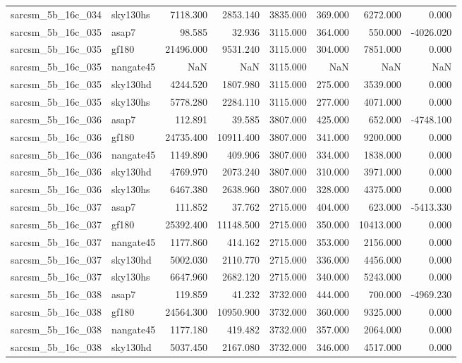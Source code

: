 \begin{tabular}{llrrrrrr}
sarcsm\_5b\_16c\_034 & sky130hs & 7118.300 & 2853.140 & 3835.000 & 369.000 & 6272.000 & 0.000 \\
sarcsm\_5b\_16c\_035 & asap7 & 98.585 & 32.936 & 3115.000 & 364.000 & 550.000 & -4026.020 \\
sarcsm\_5b\_16c\_035 & gf180 & 21496.000 & 9531.240 & 3115.000 & 304.000 & 7851.000 & 0.000 \\
sarcsm\_5b\_16c\_035 & nangate45 & NaN & NaN & 3115.000 & NaN & NaN & NaN \\
sarcsm\_5b\_16c\_035 & sky130hd & 4244.520 & 1807.980 & 3115.000 & 275.000 & 3539.000 & 0.000 \\
sarcsm\_5b\_16c\_035 & sky130hs & 5778.280 & 2284.110 & 3115.000 & 277.000 & 4071.000 & 0.000 \\
sarcsm\_5b\_16c\_036 & asap7 & 112.891 & 39.585 & 3807.000 & 425.000 & 652.000 & -4748.100 \\
sarcsm\_5b\_16c\_036 & gf180 & 24735.400 & 10911.400 & 3807.000 & 341.000 & 9200.000 & 0.000 \\
sarcsm\_5b\_16c\_036 & nangate45 & 1149.890 & 409.906 & 3807.000 & 334.000 & 1838.000 & 0.000 \\
sarcsm\_5b\_16c\_036 & sky130hd & 4769.970 & 2073.240 & 3807.000 & 310.000 & 3971.000 & 0.000 \\
sarcsm\_5b\_16c\_036 & sky130hs & 6467.380 & 2638.960 & 3807.000 & 328.000 & 4375.000 & 0.000 \\
sarcsm\_5b\_16c\_037 & asap7 & 111.852 & 37.762 & 2715.000 & 404.000 & 623.000 & -5413.330 \\
sarcsm\_5b\_16c\_037 & gf180 & 25392.400 & 11148.500 & 2715.000 & 350.000 & 10413.000 & 0.000 \\
sarcsm\_5b\_16c\_037 & nangate45 & 1177.860 & 414.162 & 2715.000 & 353.000 & 2156.000 & 0.000 \\
sarcsm\_5b\_16c\_037 & sky130hd & 5002.030 & 2110.770 & 2715.000 & 336.000 & 4456.000 & 0.000 \\
sarcsm\_5b\_16c\_037 & sky130hs & 6647.960 & 2682.120 & 2715.000 & 340.000 & 5243.000 & 0.000 \\
sarcsm\_5b\_16c\_038 & asap7 & 119.859 & 41.232 & 3732.000 & 444.000 & 700.000 & -4969.230 \\
sarcsm\_5b\_16c\_038 & gf180 & 24564.300 & 10950.900 & 3732.000 & 360.000 & 9325.000 & 0.000 \\
sarcsm\_5b\_16c\_038 & nangate45 & 1177.180 & 419.482 & 3732.000 & 357.000 & 2064.000 & 0.000 \\
sarcsm\_5b\_16c\_038 & sky130hd & 5037.450 & 2167.080 & 3732.000 & 346.000 & 4517.000 & 0.000 \\

\end{tabular}
